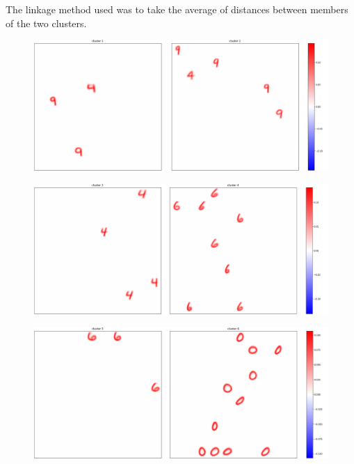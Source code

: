 \documentclass[a4paper]{report}
\begin{document}
The linkage method used was to take the average of distances between members of the two clusters.

\begin{figure} [H]
    \centering
    \includegraphics [width=\textwidth ] {c/h/1.png}
    \caption{}
\end{figure}

\begin{figure} [H]
    \centering
    \includegraphics [width=\textwidth ] {c/h/3.png}
    \caption{}
\end{figure}

\begin{figure} [H]
    \centering
    \includegraphics [width=\textwidth ] {c/h/5.png}
    \caption{}
\end{figure}
\end{document}
